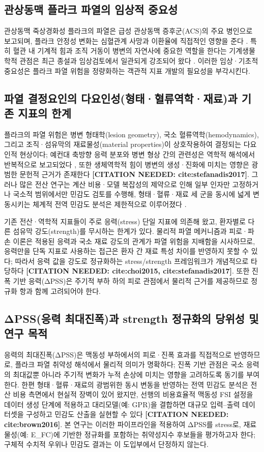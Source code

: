 \documentclass[preprint,12pt]{elsarticle}
\begin{document}
\subsection{관상동맥 플라크 파열의 임상적 중요성}
관상동맥 죽상경화성 플라크의 파열은 급성 관상동맥 증후군(ACS)의 주요 병인으로 보고되며, 플라크 안정성 변화는 심혈관계 사망과 이환율에 직접적인 영향을 준다 \cite{stefanadis2017}. 특히 혈관 내 기계적 힘과 조직 거동이 병변의 자연사에 중요한 역할을 한다는 기계생물학적 관점은 최근 종설과 임상검토에서 일관되게 강조되어 왔다 \cite{brown2016}. 이러한 임상·기초적 중요성은 플라크 파열 위험을 정량화하는 객관적 지표 개발의 필요성을 부각시킨다.

\subsection{파열 결정요인의 다요인성(형태·혈류역학·재료)과 기존 지표의 한계}
플라크의 파열 위험은 병변 형태학(lesion geometry), 국소 혈류역학(hemodynamics), 그리고 조직·섬유막의 재료물성(material properties)이 상호작용하여 결정되는 다요인적 현상이다; 예컨대 축방향 응력 분포와 병변 형상 간의 관련성은 역학적 해석에서 반복적으로 보고되었다 \cite{choi2015}, 또한 생체역학적 힘이 병변의 생성·진화에 미치는 영향은 광범한 문헌적 근거가 존재한다 \cite{brown2016} \textbf{[CITATION NEEDED: cite:stefanadis2017]}. 그러나 많은 전산 연구는 계산 비용·모델 복잡성의 제약으로 인해 일부 인자만 고정하거나 국소적 범위에서만 민감도 검토를 수행해, 형태·혈류·재료 세 군을 동시에 넓게 변동시키는 체계적 전역 민감도 분석은 제한적으로 이루어졌다 \cite{brown2016}.

기존 전산·역학적 지표들이 주로 응력(stress) 단일 지표에 의존해 왔고, 환자별로 다른 섬유막 강도(strength)를 무시하는 한계가 있다. 물리적 파열 메커니즘과 피로·파손 이론은 적용된 응력과 국소 재료 강도의 관계가 파열 위험을 지배함을 시사하므로, 응력만을 단독 지표로 사용하는 접근은 환자 간 재료 특성 차이를 반영하지 못할 수 있다; 따라서 응력 값을 강도로 정규화하는 stress/strength 프레임워크가 개념적으로 타당하다 \cite{brown2016} \textbf{[CITATION NEEDED: cite:choi2015, cite:stefanadis2017]}. 또한 진폭 기반 응력(ΔPSS)은 주기적 부하 하의 피로 관점에서 물리적 근거를 제공하므로 정규화 항과 함께 고려되어야 한다.

\subsection{ΔPSS(응력 최대진폭)과 strength 정규화의 당위성 및 연구 목적}
응력의 최대진폭(ΔPSS)은 맥동성 부하에서의 피로·진폭 효과를 직접적으로 반영하므로, 플라크 파열 취약성 해석에서 물리적 의미가 명확하다; 진폭 기반 관점은 국소 응력의 최대값뿐 아니라 주기적 변화가 누적 손상에 미치는 영향을 고려하도록 동기를 부여한다. 한편 형태·혈류·재료의 광범위한 동시 변동을 반영하는 전역 민감도 분석은 전산 비용 측면에서 현실적 장벽이 있어 왔지만, 선행의 비용효율적 맥동성 FSI 설정을 데이터 생성 단계에 적용하고 대리모델(예: GPR)을 결합하면 대규모 입력–출력 데이터셋을 구성하고 민감도 산출을 실현할 수 있다 \cite{chaichana2012} \textbf{[CITATION NEEDED: cite:brown2016]}. 본 연구는 이러한 파이프라인을 적용하여 ΔPSS를 stress로, 재료물성(예: E\_FC)에 기반한 정규화를 포함하는 취약성지수 후보들을 평가하고자 한다; 구체적 수치적 우위나 민감도 결과는 이 도입부에서 단정하지 않는다.
\end{document}
